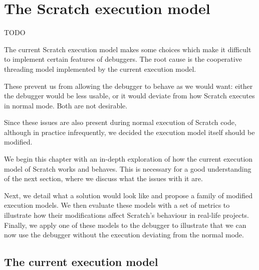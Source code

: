 \documentclass[../main]{subfiles}
\begin{document}
\chapter{The Scratch execution model}\label{ch:scratch-execution-model}


TODO

The current Scratch execution model makes some choices which make it difficult to implement certain features of debuggers.
The root cause is the cooperative threading model implemented by the current execution model.

These prevent us from allowing the debugger to behave as we would want: either the debugger would be less usable, or it would deviate from how Scratch executes in normal mode.
Both are not desirable.

Since these issues are also present during normal execution of Scratch code, although in practice infrequently, we decided the execution model itself should be modified.


We begin this chapter with an in-depth exploration of how the current execution model of Scratch works and behaves.
This is necessary for a good understanding of the next section, where we discuss what the issues with it are.

Next, we detail what a solution would look like and propose a family of modified execution models.
We then evaluate these models with a set of metrics to illustrate how their modifications affect Scratch's behaviour in real-life projects.
Finally, we apply one of these models to the debugger to illustrate that we can now use the debugger without the execution deviating from the normal mode.

\section{The current execution model}\label{sec:the-current-scratch-execution-model}
\end{document}
